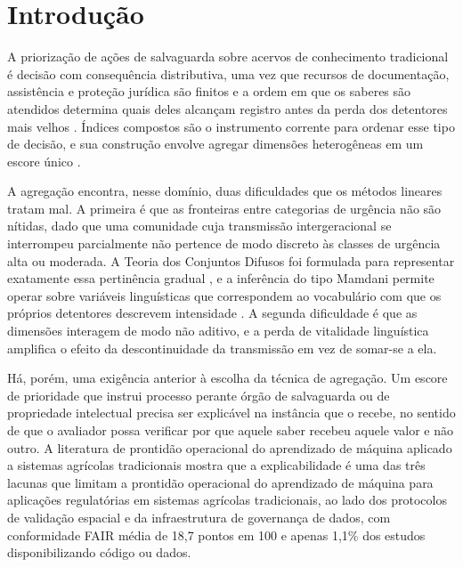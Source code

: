 \documentclass[pdflatex,sn-basic]{sn-jnl}%
\theoremstyle{thmstyleone}%
\theoremstyle{thmstyletwo}%
\theoremstyle{thmstylethree}%
\begin{document}

\maketitle


\section{Introdução}

A priorização de ações de salvaguarda sobre acervos de conhecimento tradicional é decisão com consequência distributiva, uma vez que recursos de documentação, assistência e proteção jurídica são finitos e a ordem em que os saberes são atendidos determina quais deles alcançam registro antes da perda dos detentores mais velhos \cite{TangGavin2016,FernandezLlamazares2021}. Índices compostos são o instrumento corrente para ordenar esse tipo de decisão, e sua construção envolve agregar dimensões heterogêneas em um escore único \cite{Dale2001,Niemeijer2008}.

A agregação encontra, nesse domínio, duas dificuldades que os métodos lineares tratam mal. A primeira é que as fronteiras entre categorias de urgência não são nítidas, dado que uma comunidade cuja transmissão intergeracional se interrompeu parcialmente não pertence de modo discreto às classes de urgência alta ou moderada. A Teoria dos Conjuntos Difusos foi formulada para representar exatamente essa pertinência gradual \cite{Zadeh1965}, e a inferência do tipo Mamdani permite operar sobre variáveis linguísticas que correspondem ao vocabulário com que os próprios detentores descrevem intensidade \cite{Mamdani1975}. A segunda dificuldade é que as dimensões interagem de modo não aditivo, e a perda de vitalidade linguística amplifica o efeito da descontinuidade da transmissão em vez de somar-se a ela.

Há, porém, uma exigência anterior à escolha da técnica de agregação. Um escore de prioridade que instrui processo perante órgão de salvaguarda ou de propriedade intelectual precisa ser explicável na instância que o recebe, no sentido de que o avaliador possa verificar por que aquele saber recebeu aquele valor e não outro. A literatura de prontidão operacional do aprendizado de máquina aplicado a sistemas agrícolas tradicionais mostra que a explicabilidade é uma das três lacunas que limitam a prontidão operacional do aprendizado de máquina para aplicações regulatórias em sistemas agrícolas tradicionais, ao lado dos protocolos de validação espacial e da infraestrutura de governança de dados, com conformidade FAIR média de 18,7 pontos em 100 e apenas 1,1\% dos estudos disponibilizando código ou dados.
\end{document}
